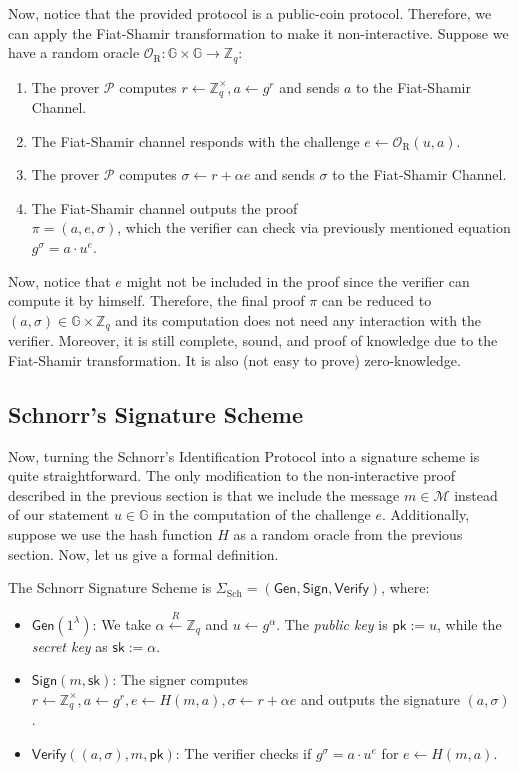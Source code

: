 \documentclass[../lecture-notes-105x135.tex]{subfiles}
\begin{document}
Now, notice that the provided protocol is a public-coin protocol. Therefore, we can apply the Fiat-Shamir transformation to make it non-interactive. Suppose we have a random oracle $\mathcal{O}_{\text{R}}: \mathbb{G} \times \mathbb{G} \to \mathbb{Z}_q$:
\begin{enumerate}
    \item The prover $\mathcal{P}$ computes $r \gets \mathbb{Z}_q^{\times}, a \gets g^{r}$ and sends $a$ to the Fiat-Shamir Channel.
    \item The Fiat-Shamir channel responds with the challenge $e \gets \mathcal{O}_{\text{R}}(u,a)$.
    \item The prover $\mathcal{P}$ computes $\sigma \gets r + \alpha e$ and sends $\sigma$ to the Fiat-Shamir Channel.
    \item The Fiat-Shamir channel outputs the proof \\ $\pi = (a,e,\sigma)$, which the verifier can check via previously mentioned equation $g^{\sigma} = a \cdot u^e$.
\end{enumerate}

Now, notice that $e$ might not be included in the proof since the verifier can compute it by himself. Therefore, the final proof $\pi$ can be reduced to $(a,\sigma) \in \mathbb{G} \times \mathbb{Z}_q$ and its computation does not need any interaction with the verifier. Moreover, it is still complete, sound, and proof of knowledge due to the Fiat-Shamir transformation. It is also (not easy to prove) zero-knowledge.

\subsection{Schnorr's Signature Scheme}

Now, turning the Schnorr's Identification Protocol into a signature scheme is quite straightforward. The only modification to the non-interactive proof described in the previous section is that we include the message $m \in \mathcal{M}$ instead of our statement $u \in \mathbb{G}$ in the computation of the challenge $e$. Additionally, suppose we use the hash function $H$ as a random oracle from the previous section. Now, let us give a formal definition.

\begin{definition}
    The Schnorr Signature Scheme is $\Sigma_{\text{Sch}} = (\mathsf{Gen}, \mathsf{Sign}, \mathsf{Verify})$, where:
    \begin{itemize}
        \item $\mathsf{Gen}(1^{\lambda})$: We take $\alpha \xleftarrow{R} \mathbb{Z}_q$ and $u \gets g^{\alpha}$. The \textit{public key} is $\mathsf{pk} := u$, while the \textit{secret key} as $\mathsf{sk} := \alpha$.
        \item $\mathsf{Sign}(m,\mathsf{sk})$: The signer computes $r \gets \mathbb{Z}_q^{\times}, a \gets g^{r}, e \gets H(m, a), \sigma \gets r + \alpha e$ and outputs the signature $(a,\sigma)$.
        \item $\mathsf{Verify}((a, \sigma), m,\mathsf{pk})$: The verifier checks if $g^{\sigma} = a \cdot u^e$ for $e \gets H(m, a)$.
    \end{itemize}
\end{definition}
\end{document}
